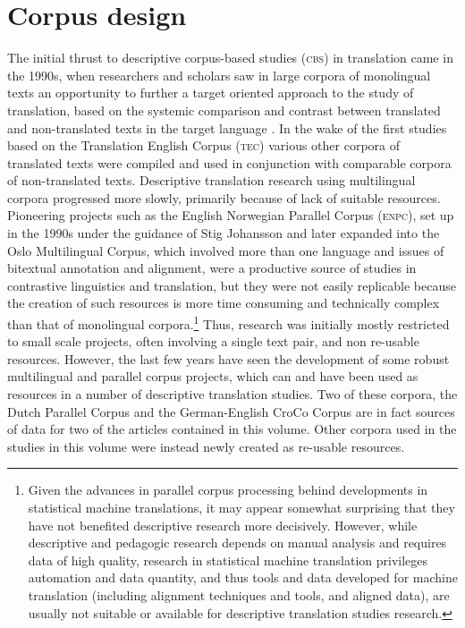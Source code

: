 \documentclass[output=paper]{LSP/langsci}
\begin{document}
\section{Corpus design }
The initial thrust to descriptive corpus-based studies (\textsc{cbs}) in translation came in the 1990s, when researchers and scholars saw in large corpora of monolingual texts an opportunity to further a target oriented approach to the study of translation, based on the systemic comparison and contrast between translated and non-translated texts in the target language \citep{Baker1993}. In the wake of the first studies based on the Translation English Corpus (\textsc{tec}) \citep{Laviosa1997} various other corpora of translated texts were compiled and used in conjunction with comparable corpora of non-translated texts. Descriptive translation research using multilingual corpora progressed more slowly, primarily because of lack of suitable resources. Pioneering projects such as the English Norwegian Parallel Corpus (\textsc{enpc}), set up in the 1990s under the guidance of Stig Johansson \citep[see e.g.][]{Johansson2007} and later expanded into the Oslo Multilingual Corpus, which involved more than one language and issues of bitextual annotation and alignment, were a productive source of studies in contrastive linguistics and translation, but they were not easily replicable because the creation of such resources is more time consuming and technically complex than that of monolingual corpora.\footnote{Given the advances in parallel corpus processing behind developments in statistical machine translations, it may appear somewhat surprising that they have not benefited descriptive research more decisively. However, while descriptive and pedagogic research depends on manual analysis and requires data of high quality, research in statistical machine translation privileges automation and data quantity, and thus tools and data developed for machine translation (including alignment techniques and tools, and aligned data), are usually not suitable or available for descriptive translation studies research.} Thus, research was initially mostly restricted to small scale projects, often involving a single text pair, and non re-usable resources. However, the last few years have seen the development of some robust multilingual and parallel corpus projects, which can and have been used as resources in a number of descriptive translation studies. Two of these corpora, the Dutch Parallel Corpus \citep{Rura2008} and the German-English CroCo Corpus \citep{Croco:2013} are in fact sources of data for two of the articles contained in this volume. Other corpora used in the studies in this volume were instead newly created as re-usable resources. 
\end{document}
